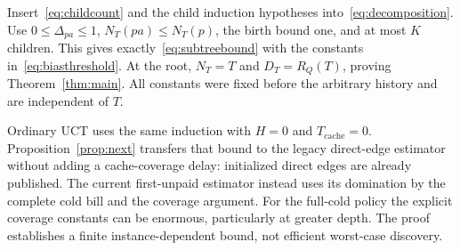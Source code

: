 Insert~\eqref{eq:childcount} and the child induction hypotheses into~\eqref{eq:decomposition}. Use $0\le\Delta_{pa}\le1$, $N_T(pa)\le N_T(p)$, the birth bound one, and at most $K$ children. This gives exactly~\eqref{eq:subtreebound} with the constants in~\eqref{eq:biasthreshold}. At the root, $N_T=T$ and $D_T=R_Q(T)$, proving Theorem~\ref{thm:main}. All constants were fixed before the arbitrary history and are independent of $T$.

Ordinary UCT uses the same induction with $H=0$ and $T_{\mathrm{cache}}=0$. Proposition~\ref{prop:next} transfers that bound to the legacy direct-edge estimator without adding a cache-coverage delay: initialized direct edges are already published. The current first-unpaid estimator instead uses its domination by the complete cold bill and the coverage argument. For the full-cold policy the explicit coverage constants can be enormous, particularly at greater depth. The proof establishes a finite instance-dependent bound, not efficient worst-case discovery.

